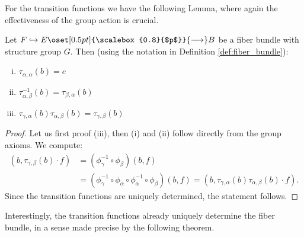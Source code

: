     For the transition functions we have the following Lemma, where again the effectiveness of the group action is crucial.

    \begin{lemma}
        \label{lem:transition_functions}
        Let $F \hookrightarrow E \oset[0.5pt]{\scalebox{0.8}{$p$}}{\longrightarrow} B$ be a fiber bundle with structure group $G$. Then (using the notation in Definition \ref{def:fiber_bundle}):
        \begin{enumerate}[(i)]
            \item $\tau_{\alpha,\alpha}(b) = e$
            \item $\tau_{\alpha,\beta}^{-1}(b) = \tau_{\beta,\alpha}(b)$
            \item $\tau_{\gamma,\alpha}(b)\tau_{\alpha,\beta}(b) = \tau_{\gamma,\beta}(b)$
        \end{enumerate}
    \end{lemma}
    \begin{proof}
        Let us first proof (iii), then (i) and (ii) follow directly from the group axioms. We compute:
        \begin{align*}
            (b,\tau_{\gamma,\beta}(b) \cdot f) & = (\phi_\gamma^{-1} \circ \phi_\beta)(b,f) \\ & = (\phi_\gamma^{-1} \circ \phi_\alpha \circ \phi_\alpha^{-1} \circ \phi_\beta)(b,f) = (b,\tau_{\gamma,\alpha}(b)\tau_{\alpha,\beta}(b) \cdot f).
        \end{align*}
        Since the transition functions are uniquely determined, the statement follows. 
    \end{proof}

     Interestingly, the transition functions already uniquely determine the fiber bundle, in a sense made precise by the following theorem.

